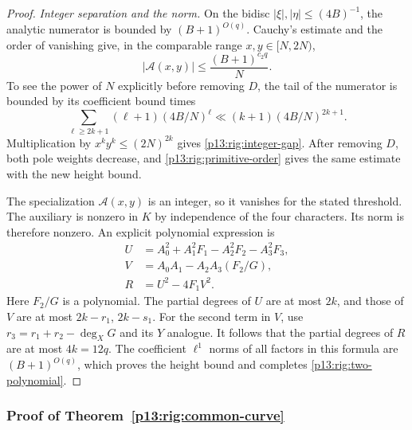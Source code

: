 \begin{proof}
\emph{Integer separation and the norm.}
On the bidisc $|\xi|,|\eta|\le(4B)^{-1}$, the analytic
numerator is bounded by $(B+1)^{O(q)}$.  Cauchy's estimate
and the order of vanishing give, in the comparable range
$x,y\in[N,2N)$,
\begin{equation}
                  |\mathcal A(x,y)|\le
                                   \frac{(B+1)^{c_2q}}N.
 \label{p13:rig:integer-gap}
\end{equation}
To see the power of $N$ explicitly before removing $D$, the
tail of the numerator is bounded by its coefficient bound
times
\[
 \sum_{\ell\ge2k+1}(\ell+1)(4B/N)^\ell
       \ll(k+1)(4B/N)^{2k+1}.
\]
Multiplication by $x^ky^k\le(2N)^{2k}$ gives
\eqref{p13:rig:integer-gap}.  After removing $D$, both pole
weights decrease, and \eqref{p13:rig:primitive-order} gives
the same estimate with the new height bound.

The specialization $\mathcal A(x,y)$ is an integer, so it
vanishes for the stated threshold.  The auxiliary is nonzero
in $K$ by independence of the four characters.  Its norm is
therefore nonzero.  An explicit polynomial expression is
\[
 \begin{split}
 U&=A_0^2+A_1^2F_1-A_2^2F_2-A_3^2F_3,\\
 V&=A_0A_1-A_2A_3(F_2/G),\\
 R&=U^2-4F_1V^2.
 \end{split}
\]
Here $F_2/G$ is a polynomial.  The partial degrees of $U$
are at most $2k$, and those of $V$ are at most
$2k-r_1$, $2k-s_1$.  For the second term in $V$, use
$r_3=r_1+r_2-\deg_XG$ and its $Y$ analogue.
It follows that the partial degrees of $R$ are at most
$4k=12q$.  The coefficient $\ell^1$ norms of all factors
in this formula are $(B+1)^{O(q)}$, which proves the height
bound and completes \eqref{p13:rig:two-polynomial}.
\end{proof}


\subsubsection{Proof of Theorem~\ref{p13:rig:common-curve}}
\label{p14:comp:rigidity:common-curve}

